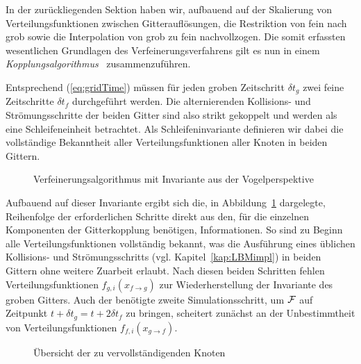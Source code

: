 In der zurückliegenden Sektion haben wir, aufbauend auf der Skalierung von Verteilungsfunktionen zwischen Gitterauflösungen, die Restriktion von fein nach grob sowie die Interpolation von grob zu fein nachvollzogen. Die somit erfassten wesentlichen Grundlagen des Verfeinerungsverfahrens gilt es nun in einem \emph{Kopplungsalgorithmus}~\cite[Kap.~3.5]{Lagrava12} zusammenzuführen.

\bigskip

Entsprechend (\ref{eq:gridTime}) müssen für jeden groben Zeitschritt \(\delta t_g\) zwei feine Zeitschritte \(\delta t_f\) durchgeführt werden. Die alternierenden Kollisions- und Strömungsschritte der beiden Gitter sind also strikt gekoppelt und werden als eine Schleifeneinheit betrachtet. Als Schleifeninvariante definieren wir dabei die vollständige Bekanntheit aller Verteilungsfunktionen aller Knoten in beiden Gittern.

\begin{figure}[h]

\caption{Verfeinerungsalgorithmus mit Invariante aus der Vogelperspektive}
\label{fig:AlgorithmBirdsEye}
\end{figure}
\noindent
Aufbauend auf dieser Invariante ergibt sich die, in Abbildung~\ref{fig:AlgorithmBirdsEye} dargelegte, Reihenfolge der erforderlichen Schritte direkt aus den, für die einzelnen Komponenten der Gitterkopplung benötigen, Informationen. So sind zu Beginn alle Verteilungsfunktionen vollständig bekannt, was die Ausführung eines üblichen Kollisions- und Strömungsschritts (vgl. Kapitel~\ref{kap:LBMimpl}) in beiden Gittern ohne weitere Zuarbeit erlaubt. Nach diesen beiden Schritten fehlen Verteilungsfunktionen \(f_{g,i}(x_{f \to g})\) zur Wiederherstellung der Invariante des groben Gitters. Auch der benötigte zweite Simulationsschritt, um \(\mathcal{F}\) auf Zeitpunkt \(t+\delta t_g=t+2\delta t_f\) zu bringen, scheitert zunächst an der Unbestimmtheit von Verteilungsfunktionen \(f_{f,i}(x_{g \to f})\).

\begin{figure}[h]
\centering

\caption{Übersicht der zu vervollständigenden Knoten}
\end{figure}

